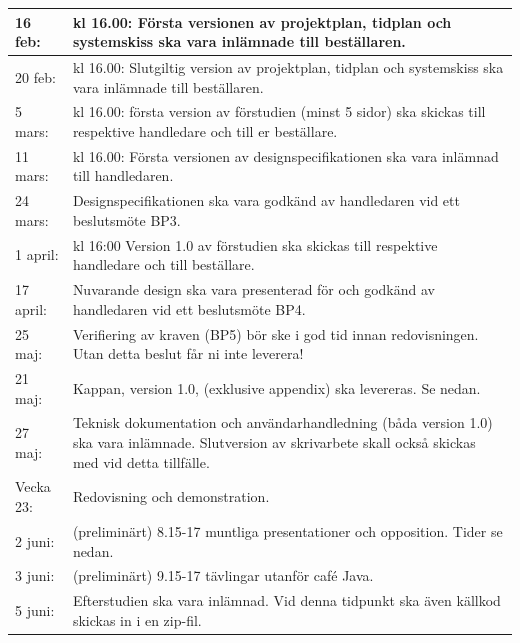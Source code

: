\documentclass[11pt]{article}
\begin{document}
\begin{flushleft}
\begin{center}
\begin{longtable}{|l |p{.8\linewidth}|}
16 feb: & 
kl 16.00: Första versionen av projektplan, tidplan och systemskiss ska vara inlämnade till beställaren. \\ \hline

20 feb: & 
kl 16.00: Slutgiltig version av projektplan, tidplan och systemskiss ska vara inlämnade till beställaren. \\ \hline

5 mars: &
kl 16.00: första version av förstudien (minst 5 sidor) ska skickas till respektive handledare och till er beställare. \\ \hline

11 mars: & 
kl 16.00: Första versionen av designspecifikationen ska vara inlämnad till handledaren. \\ \hline

24 mars: &
Designspecifikationen ska vara godkänd av handledaren vid ett beslutsmöte BP3. \\ \hline

1 april: &
kl 16:00 Version 1.0 av förstudien ska skickas till respektive handledare och till beställare. \\ \hline

17 april: & 
Nuvarande design ska vara presenterad för och godkänd av handledaren vid ett beslutsmöte BP4. \\ \hline

25 maj: &
Verifiering av kraven (BP5) bör ske i god tid innan redovisningen. Utan detta beslut får ni inte leverera! \\ \hline

21 maj: &
Kappan, version 1.0, (exklusive appendix) ska levereras. Se nedan. \\ \hline

27 maj: &
Teknisk dokumentation och användarhandledning (båda version 1.0) ska vara inlämnade. Slutversion av skrivarbete skall också skickas med vid detta tillfälle. \\ \hline

Vecka 23: &
Redovisning och demonstration.\\ \hline

2 juni: &
(preliminärt) 8.15-17 muntliga presentationer och opposition. Tider se nedan. \\ \hline

3 juni: &
(preliminärt) 9.15-17 tävlingar utanför café Java. \\ \hline

5 juni: &
Efterstudien ska vara inlämnad. Vid denna tidpunkt ska även källkod skickas in i en zip-fil. \\ \hline


\end{longtable}
\end{center}
\end{flushleft}
\end{document}
